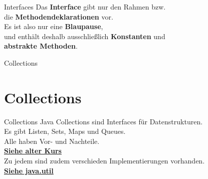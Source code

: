 \documentclass[10pt]{beamer}
\begin{document}
\begin{frame}[fragile]{Interfaces}
Das  \textcolor{mygreen}{\textbf{Interface}} gibt nur den Rahmen bzw. \\
die \textcolor{mygray}{\textbf{Methodendeklarationen}} vor. \\
Es ist also nur eine \textcolor{mygreen}{\textbf{Blaupause}}, \\
und enthält deshalb ausschließlich \textcolor{mymauve}{\textbf{Konstanten}} und \\ 
\textcolor{mymauve}{\textbf{abstrakte Methoden}}. \\
\end{frame}

\begin{frame}[fragile]{Collections}
    \section{Collections}
\end{frame}

\begin{frame}[fragile]{Collections}
Java Collections sind Interfaces für Datenstrukturen.\\
Es gibt Listen, Sets, Maps und Queues.\\
Alle haben Vor- und Nachteile.\\
\textcolor{mymauve}{\textbf{\href{https://github.com/RatedARRR/TUT-JAVA-2018/blob/master/Slides/Javakurs 6-13.pdf}{Siehe alter Kurs}}}\\
Zu jedem sind zudem verschieden Implementierungen vorhanden.\\
\textcolor{mymauve}{\textbf{\href{https://docs.oracle.com/javase/8/docs/api/java/util/package-summary.html}{Siehe java.util}}}
\end{frame}
\end{document}
